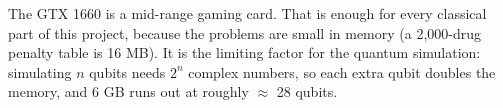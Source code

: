 The GTX 1660 is a mid-range gaming card. That is enough for every classical part of this project, because the problems are small in memory (a 2{,}000-drug penalty table is 16 MB). It is the limiting factor for the quantum simulation: simulating $n$ qubits needs $2^n$ complex numbers, so each extra qubit doubles the memory, and 6 GB runs out at roughly $\approx$ 28 qubits.


